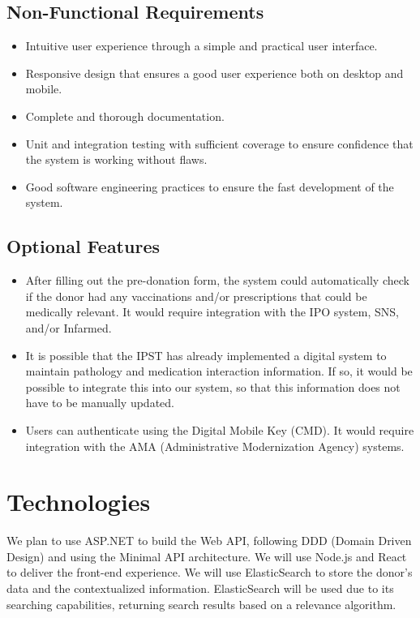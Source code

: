 \documentclass[a4paper,11pt]{article}
\begin{document}
\subsection{Non-Functional Requirements}
\begin{itemize}
	\item Intuitive user experience through a simple and practical user interface.
	
	\item Responsive design that ensures a good user experience both on desktop and mobile.
	
	\item Complete and thorough documentation.
	
	\item Unit and integration testing with sufficient coverage to ensure confidence that the system is working without flaws.
	
	\item Good software engineering practices to ensure the fast development of the system.
\end{itemize}

\subsection{Optional Features}
\begin{itemize}
	\item After filling out the pre-donation form, the system could automatically check if the donor had any vaccinations and/or prescriptions that could be medically relevant. It would require integration with the IPO system, SNS, and/or Infarmed.
	\item It is possible that the IPST has already implemented a digital system to maintain pathology and medication interaction information. If so, it would be possible to integrate this into our system, so that this information does not have to be manually updated.
	\item Users can authenticate using the Digital Mobile Key (CMD). It would require integration with the AMA (Administrative Modernization Agency) systems.
\end{itemize}

\section{Technologies}
We plan to use ASP.NET \cite{aspnet} to build the Web API, following DDD (Domain Driven Design) and using the Minimal API \cite{minimalAPI} architecture. We will use Node.js \cite{nodejs} and React \cite{react} to deliver the front-end experience. We will use ElasticSearch \cite{elasticsearch} to store the donor’s data and the contextualized information. ElasticSearch will be used due to its searching capabilities, returning search results based on a relevance algorithm.
\end{document}
